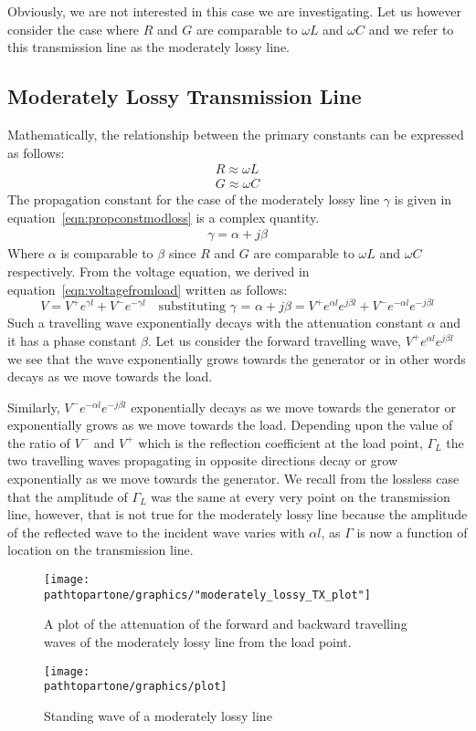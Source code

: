 Obviously, we are not interested in this case we are investigating. Let us however consider the case where $R$ and $G$ are comparable to $\omega L$ and $\omega C$ and we refer to this transmission line as the moderately lossy line.

\subsection{Moderately Lossy Transmission Line}Mathematically, the relationship between the primary constants can be expressed as follows:
\begin{align*}
R \approx \omega L\\
G \approx \omega C
\end{align*}
The propagation constant for the case of the moderately lossy line $\gamma$ is given in equation~\eqref{eqn:propconstmodloss} is a complex quantity.
\begin{align}
\gamma = \alpha +j\beta
\label{eqn:propconstmodloss}
\end{align}
Where $\alpha$ is comparable to $\beta$ since $R$ and $G$ are comparable to $\omega L$ and $\omega C$ respectively. From the voltage equation, we derived in equation~\eqref{eqn:voltagefromload} written as follows:
\begin{dmath*}
V = V^+e^{\gamma l} + V^-e^{
-\gamma l}\quad\text{substituting }\gamma\text{ = }\alpha + j\beta
= V^+e^{\alpha l}e^{j\beta l} + V^-e^{-\alpha l}e^{-j\beta l}
\end{dmath*}
Such a travelling wave exponentially decays with the attenuation constant $\alpha$ and it has a phase constant $\beta$. Let us consider the forward travelling wave, $V^+e^{\alpha l}e^{j\beta l}$ we see that the wave exponentially grows towards the generator or in other words decays as we move towards the load.

Similarly, $V^-e^{-\alpha l}e^{-j\beta l}$ exponentially decays as we move towards the generator or exponentially grows as we move towards the load. Depending upon the value of the ratio of $V^-$ and $V^+$ which is the reflection coefficient at the load point, $\Gamma_L$ the two travelling waves propagating in opposite directions decay or grow exponentially as we move towards the generator. We recall from the lossless case that the amplitude of $\Gamma_L$ was the same at every very point on the transmission line, however, that is not true for the moderately lossy line because the amplitude of the reflected wave to the incident wave varies with $\alpha l$, as $\Gamma$ is now a function of location on the transmission line.
\begin{figure}[h]
\centering
\texttt{[image: \\pathtopartone/graphics/"moderately\_lossy\_TX\_plot"]}
\caption{A plot of the attenuation of the forward and backward travelling waves of the moderately lossy line from the load point.}
\end{figure}
\begin{figure}[h]
\centering
\texttt{[image: \\pathtopartone/graphics/plot]}
\caption{Standing wave of a moderately lossy line}
\end{figure}

